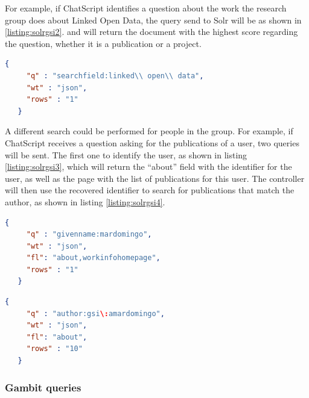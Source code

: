 For example, if ChatScript identifies a question about the work the research group does about Linked Open Data, the query send to Solr will be as shown in \ref{listing:solrgsi2}. and will return the document with the highest score regarding the question, whether it is a publication or a project.

\begin{center} 
  \begin{lstlisting}[language=json, caption=Example query asking for Linked Open Data, label=listing:solrgsi2]
   {
     "q" : "searchfield:linked\\ open\\ data",
     "wt" : "json",
     "rows" : "1"
   }  
  \end{lstlisting}
\end{center}

A different search could be performed for people in the group. For example, if ChatScript receives a question asking for the publications of a user, two queries will be sent. The first one to identify the user, as shown in listing \ref{listing:solrgsi3}, which will return the ``about'' field with the identifier for the user, as well as the page with the list of publications for this user. The controller will then use the recovered identifier to search for publications that match the author, as shown in listing \ref{listing:solrgsi4}.

\begin{center} 
  \begin{lstlisting}[language=json, caption=Query asking for the data about a user, label=listing:solrgsi3]
   {
     "q" : "givenname:mardomingo",
     "wt" : "json",
     "fl": "about,workinfohomepage",
     "rows" : "1"
   }  
  \end{lstlisting}
\end{center}

\begin{center} 
  \begin{lstlisting}[language=json, caption=Query asking for the data about a user, label=listing:solrgsi4]
   {
     "q" : "author:gsi\:amardomingo",
     "wt" : "json",
     "fl": "about",
     "rows" : "10"
   }  
  \end{lstlisting}
\end{center}

\subsubsection{Gambit queries}

